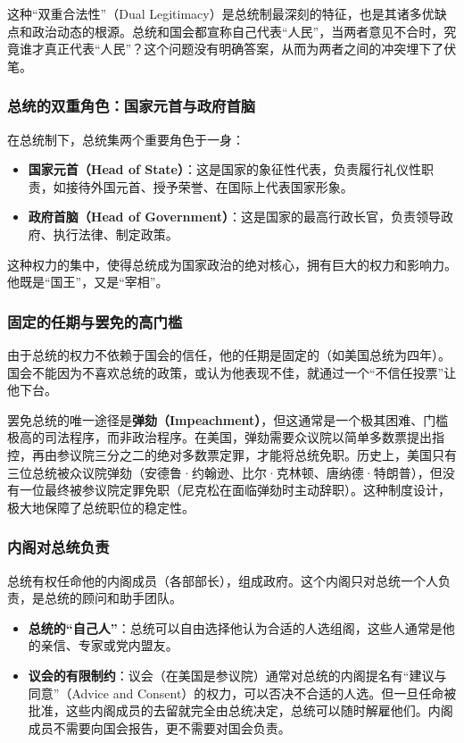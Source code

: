 这种“双重合法性”（Dual Legitimacy）是总统制最深刻的特征，也是其诸多优缺点和政治动态的根源。总统和国会都宣称自己代表“人民”，当两者意见不合时，究竟谁才真正代表“人民”？这个问题没有明确答案，从而为两者之间的冲突埋下了伏笔。

\subsubsection*{总统的双重角色：国家元首与政府首脑}

在总统制下，总统集两个重要角色于一身：
\begin{itemize}
    \item \textbf{国家元首（Head of State）}：这是国家的象征性代表，负责履行礼仪性职责，如接待外国元首、授予荣誉、在国际上代表国家形象。
    \item \textbf{政府首脑（Head of Government）}：这是国家的最高行政长官，负责领导政府、执行法律、制定政策。
\end{itemize}

这种权力的集中，使得总统成为国家政治的绝对核心，拥有巨大的权力和影响力。他既是“国王”，又是“宰相”。

\subsubsection*{ 固定的任期与罢免的高门槛}

由于总统的权力不依赖于国会的信任，他的任期是固定的（如美国总统为四年）。国会不能因为不喜欢总统的政策，或认为他表现不佳，就通过一个“不信任投票”让他下台。

罢免总统的唯一途径是\textbf{弹劾（Impeachment）}，但这通常是一个极其困难、门槛极高的司法程序，而非政治程序。在美国，弹劾需要众议院以简单多数票提出指控，再由参议院三分之二的绝对多数票定罪，才能将总统免职。历史上，美国只有三位总统被众议院弹劾（安德鲁·约翰逊、比尔·克林顿、唐纳德·特朗普），但没有一位最终被参议院定罪免职（尼克松在面临弹劾时主动辞职）。这种制度设计，极大地保障了总统职位的稳定性。

\subsubsection*{ 内阁对总统负责}

总统有权任命他的内阁成员（各部部长），组成政府。这个内阁只对总统一个人负责，是总统的顾问和助手团队。
\begin{itemize}
    \item \textbf{总统的“自己人”}：总统可以自由选择他认为合适的人选组阁，这些人通常是他的亲信、专家或党内盟友。
    \item \textbf{议会的有限制约}：议会（在美国是参议院）通常对总统的内阁提名有“建议与同意”（Advice and Consent）的权力，可以否决不合适的人选。但一旦任命被批准，这些内阁成员的去留就完全由总统决定，总统可以随时解雇他们。内阁成员不需要向国会报告，更不需要对国会负责。
\end{itemize}

